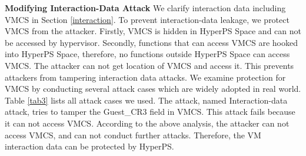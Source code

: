 \textbf{Modifying Interaction-Data Attack}
We clarify interaction data including VMCS in Section \ref{interaction}.
To prevent interaction-data leakage, we protect VMCS from the attacker. Firstly, VMCS is hidden in HyperPS Space and can not be accessed by hypervisor. Secondly, functions that can access VMCS are hooked into HyperPS Space, therefore, no functions outside HyperPS Space can access VMCS. The attacker can not get location of VMCS and access it. This prevents attackers from tampering interaction data attacks. We examine protection for VMCS by conducting several attack cases which are widely adopted in real world. Table \ref{tab3} lists all attack cases we used. The attack, named Interaction-data attack, tries to tamper the Guest\_CR3 field in VMCS. This attack fails because it can not access VMCS. 
  According to the above analysis, the attacker can not access VMCS, and can not conduct further attacks. Therefore, the VM interaction data can be protected by HyperPS.
\fi



